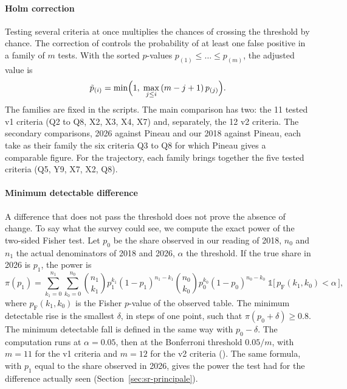 \paragraph{Holm correction}
Testing several criteria at once multiplies the chances of crossing the threshold by chance. The
correction of \textcite{holm1979simple} controls the probability of at least one false positive in a
family of $m$ tests. With the sorted $p$-values $p_{(1)} \leq \dots \leq p_{(m)}$, the adjusted value is
\begin{equation}
  \tilde{p}_{(i)} = \min\Bigl(1,\; \max_{j \leq i}\, (m - j + 1)\, p_{(j)} \Bigr).
\end{equation}
The families are fixed in the scripts. The main comparison has two: the 11 tested v1 criteria (Q2 to
Q8, X2, X3, X4, X7) and, separately, the 12 v2 criteria. The secondary comparisons, 2026 against Pineau
and our 2018 against Pineau, each take as their family the six criteria Q3 to Q8 for which Pineau gives
a comparable figure. For the trajectory, each family brings together the five tested criteria (Q5, Y9,
X7, X2, Q8).

\paragraph{Minimum detectable difference}
A difference that does not pass the threshold does not prove the absence of change. To say what the survey
could see, we compute the exact power of the two-sided Fisher test. Let $p_0$ be the share observed in our reading of 2018, $n_0$ and $n_1$ the
actual denominators of 2018 and 2026, $\alpha$ the threshold. If the true share in 2026 is $p_1$, the
power is
\begin{equation}
  \pi(p_1) = \sum_{k_1 = 0}^{n_1} \sum_{k_0 = 0}^{n_0}
  \binom{n_1}{k_1} p_1^{k_1} (1 - p_1)^{n_1 - k_1}
  \binom{n_0}{k_0} p_0^{k_0} (1 - p_0)^{n_0 - k_0}\;
  \mathbb{1}\bigl[\, p_{\text{F}}(k_1, k_0) < \alpha \,\bigr],
\end{equation}
where $p_{\text{F}}(k_1, k_0)$ is the Fisher $p$-value of the observed table. The minimum detectable
rise is the smallest $\delta$, in steps of one point, such that $\pi(p_0 + \delta) \geq 0.8$. The
minimum detectable fall is defined in the same way with $p_0 - \delta$. The computation runs at
$\alpha = 0.05$, then at the Bonferroni threshold $0.05/m$, with $m = 11$ for the v1 criteria and
$m = 12$ for the v2 criteria (). The same formula, with $p_1$ equal to the
share observed in 2026, gives the power the test had for the difference actually seen
(Section~\ref{sec:sr-principale}).

